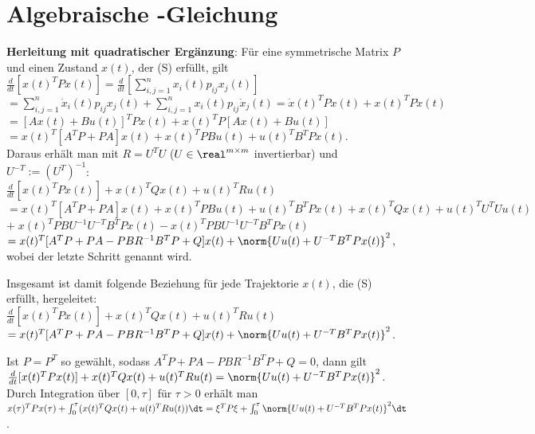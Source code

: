 \pagebreak

\section{%
    Algebraische -Gleichung%
}

\textbf{Herleitung mit quadratischer Ergänzung}:
Für eine symmetrische Matrix $P$ und einen Zustand $x(t)$, der (S) erfüllt, gilt
$\frac{d}{dt} [x(t)^T Px(t)]
= \frac{d}{dt} [\sum_{i,j=1}^n x_i(t) p_{ij} x_j(t)]$\\
$= \sum_{i,j=1}^n \dot{x}_i(t) p_{ij} x_j(t) + \sum_{i,j=1}^n x_i(t) p_{ij} \dot{x}_j(t)
= \dot{x}(t)^T Px(t) + x(t)^T P\dot{x}(t)$\\
$= [Ax(t) + Bu(t)]^T Px(t) + x(t)^T P [Ax(t) + Bu(t)]$\\
$= x(t)^T [A^T P + PA] x(t) + x(t)^T PB u(t) + u(t)^T B^T Px(t)$.\\
Daraus erhält man mit $R = U^T U$ ($U \in \real^{m \times m}$ invertierbar) und
$U^{-T} := (U^T)^{-1}$:\\
$\frac{d}{dt} [x(t)^T Px(t)] + x(t)^T Qx(t) + u(t)^T Ru(t)$\\
$= x(t)^T [A^T P + PA] x(t) + x(t)^T PB u(t) + u(t)^T B^T Px(t) + x(t)^T Qx(t) +
u(t)^T U^T Uu(t)$\\
$+\; x(t)^T PB U^{-1} U^{-T} B^T P x(t) - x(t)^T PB U^{-1} U^{-T} B^T P x(t)$\\
$= x(t)^T [A^T P + PA - PBR^{-1} B^T P + Q] x(t) + \norm{Uu(t) + U^{-T} B^T P x(t)}^2$,
wobei der letzte Schritt  genannt wird.

\linie

Insgesamt ist damit folgende Beziehung für jede Trajektorie $x(t)$, die (S) erfüllt, hergeleitet:\\
$\frac{d}{dt} [x(t)^T Px(t)] + x(t)^T Qx(t) + u(t)^T Ru(t)$\\
$= x(t)^T [A^T P + PA - PBR^{-1} B^T P + Q] x(t) + \norm{Uu(t) + U^{-T} B^T P x(t)}^2$.

Ist $P = P^T$ so gewählt, sodass $A^T P + PA - PBR^{-1} B^T P + Q = 0$, dann gilt\\
$\frac{d}{dt} [x(t)^T Px(t)] + x(t)^T Qx(t) + u(t)^T Ru(t) = \norm{Uu(t) + U^{-T} B^T P x(t)}^2$.\\
Durch Integration über $[0, \tau]$ für $\tau > 0$ erhält man\\
$x(\tau)^T Px(\tau) + \int_0^\tau (x(t)^T Qx(t) + u(t)^T Ru(t)) \dt
= \xi^T P \xi + \int_0^\tau \norm{Uu(t) + U^{-T} B^T P x(t)}^2 \dt$.


